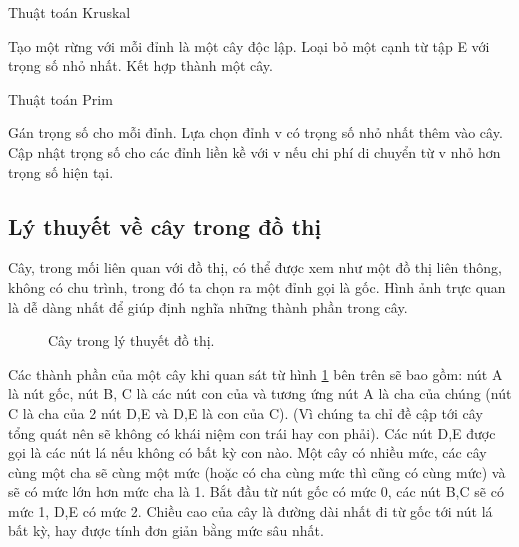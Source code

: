 \documentclass{hust}
\begin{document}
\begin{algorithm}
	\caption{Thuật toán Kruskal}\label{euclid}
	\begin{algorithmic}[1]
		\State Tạo một rừng với mỗi đỉnh là một cây độc lập.
		\State Loại bỏ một cạnh từ tập E với trọng số nhỏ nhất.
		\State Kết hợp thành một cây.	
		\EndIf	
		\EndWhile 
		\EndProcedure
	\end{algorithmic}
\end{algorithm}

\begin{algorithm}
	\renewcommand{\thealgorithm}{}
	\caption{Thuật toán Prim}\label{euclid}
	\begin{algorithmic}[1]
		\State Gán trọng số cho mỗi đỉnh.
		\State Lựa chọn đỉnh v có trọng số nhỏ nhất thêm vào cây.
		\State Cập nhật trọng số cho các đỉnh liền kề với v nếu chi phí di chuyển từ v nhỏ hơn trọng số hiện tại.
		\EndWhile 
		\EndProcedure
	\end{algorithmic}
\end{algorithm}

\subsection{Lý thuyết về cây trong đồ thị}
Cây, trong mối liên quan với đồ thị, có thể được xem như một đồ thị liên thông, không có chu trình, trong đó ta chọn ra một đỉnh gọi là gốc. Hình ảnh trực quan là dễ dàng nhất để giúp định nghĩa những thành phần trong cây.

\begin{figure}[htb]
	\caption{Cây trong lý thuyết đồ thị.}\label{fig:tree}
\end{figure}


Các thành phần của một cây khi quan sát từ hình \ref{fig:tree} bên trên sẽ bao gồm: nút A là nút gốc, nút B, C là các nút con của và tương ứng nút A là cha của chúng (nút C là cha của 2 nút D,E và D,E là con của C). (Vì chúng ta chỉ đề cập tới cây tổng quát nên sẽ không có khái niệm con trái hay con phải). Các nút D,E được gọi là các nút lá nếu không có bất kỳ con nào. Một cây có nhiều mức, các cây cùng một cha sẽ cùng một mức (hoặc có cha cùng mức thì cũng có cùng mức) và sẽ có mức lớn hơn mức cha là 1. Bắt đầu từ nút gốc có mức 0, các nút B,C sẽ có mức 1, D,E có mức 2. Chiều cao của cây là đường dài nhất đi từ gốc tới nút lá bất kỳ, hay được tính đơn giản bằng mức sâu nhất.
\end{document}
